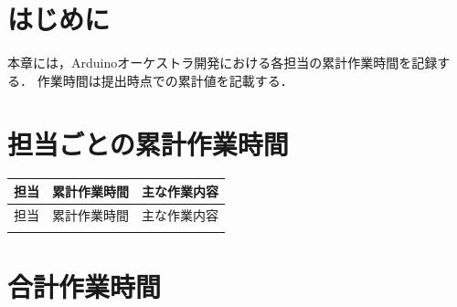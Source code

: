 
\section{はじめに}
本章には，Arduinoオーケストラ開発における各担当の累計作業時間を記録する．
作業時間は提出時点での累計値を記載する．

\section{担当ごとの累計作業時間}

\begin{longtable}{p{4cm}p{2.5cm}p{8.5cm}}
\toprule
担当 & 累計作業時間 & 主な作業内容 \\
\midrule
\endfirsthead

\toprule
担当 & 累計作業時間 & 主な作業内容 \\
\midrule
\endhead


\bottomrule
\endfoot
\end{longtable}

\section{合計作業時間}

